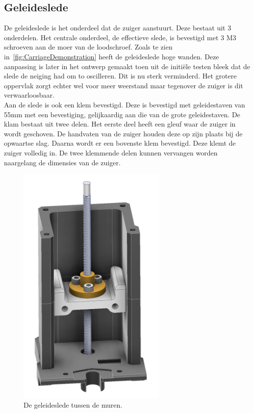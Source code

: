 \subsection{Geleideslede}
De geleideslede is het onderdeel dat de zuiger aanstuurt. Deze bestaat uit 3 onderdelen. Het centrale onderdeel, de effectieve slede, is bevestigd met 3 M3 schroeven aan de moer van de loodschroef. Zoals te zien in\ \autoref{fig:CarriageDemonstration} heeft de geleideslede hoge wanden. Deze aanpassing is later in het ontwerp gemaakt toen uit de initiële testen bleek dat de slede de neiging had om to oscilleren. Dit is nu sterk verminderd. Het grotere oppervlak zorgt echter wel voor meer weerstand maar tegenover de zuiger is dit verwaarloosbaar.
\\[12pt]Aan de slede is ook een klem bevestigd. Deze is bevestigd met geleidestaven van 55mm met een bevestiging, gelijkaardig aan die van de grote geleidestaven. De klam bestaat uit twee delen. Het eerste deel heeft een gleuf waar de zuiger in wordt geschoven. De handvaten van de zuiger houden deze op zijn plaats bij de opwaartse slag. Daarna wordt er een bovenste klem bevestigd. Deze klemt de zuiger volledig in. De twee klemmende delen kunnen vervangen worden naargelang de dimensies van de zuiger.
\\[12pt]\begin{minipage}[t]{0.39\textwidth}
    \vspace{0pt}
    \begin{figure}[H]
        \centering
        \includegraphics[width=0.65\textwidth]{figures/CarriageDemonstration.png}
        \caption{De geleideslede tussen de muren.}\label{fig:CarriageDemonstration}
    \end{figure}
\end{minipage}
